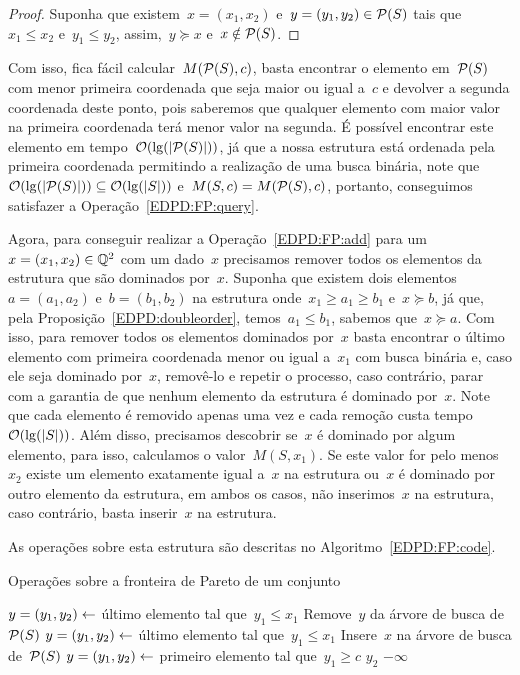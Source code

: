 \begin{proof}
Suponha que existem~$x = (x_1,x_2)$ e~$y = (y_1,y_2) \in \mathcal{P}(S)$ tais que~$x_1 \leq x_2$ e~$y_1 \leq y_2$, assim,~$y \succeq x$ e~$x \notin \mathcal{P}(S)$.
\end{proof}

Com isso, fica fácil calcular~$M(\mathcal{P}(S),c)$, basta encontrar o elemento em~$\mathcal{P}(S)$ com menor primeira coordenada que seja maior ou igual a~$c$ e devolver a segunda coordenada deste ponto, pois saberemos que qualquer elemento com maior valor na primeira coordenada terá menor valor na segunda. É possível encontrar este elemento em tempo~$\mathcal{O}(\lg(|\mathcal{P}(S)|))$, já que a nossa estrutura está ordenada pela primeira coordenada permitindo a realização de uma busca binária, note que~${\mathcal{O}(\lg(|\mathcal{P}(S)|)) \subseteq \mathcal{O}(\lg(|S|))}$ e~$M(S,c) = M(\mathcal{P}(S),c)$, portanto, conseguimos satisfazer a Operação~\ref{EDPD:FP:query}.


Agora, para conseguir realizar a Operação~\ref{EDPD:FP:add} para um~$x = (x_1,x_2) \in \mathbb{Q}^2$ com um dado~$x$ precisamos remover todos os elementos da estrutura que são dominados por~$x$. Suponha que existem dois elementos~$a = (a_1,a_2)$ e~$b = (b_1,b_2)$ na estrutura onde~$x_1 \geq a_1 \geq b_1$ e~$x \succeq b$, já que, pela Proposição~\ref{EDPD:doubleorder}, temos~$a_1 \leq b_1$, sabemos que~$x \succeq a$. Com isso, para remover todos os elementos dominados por~$x$ basta encontrar o último elemento com primeira coordenada menor ou igual a~$x_1$ com busca binária e, caso ele seja dominado por~$x$, removê-lo e repetir o processo, caso contrário, parar com a garantia de que nenhum elemento da estrutura é dominado por~$x$. Note que cada elemento é removido apenas uma vez e cada remoção custa tempo~$\mathcal{O}(\lg(|S|))$. Além disso, precisamos descobrir se~$x$ é dominado por algum elemento, para isso, calculamos o valor~$M(S,x_1)$. Se este valor for pelo menos~$x_2$ existe um elemento exatamente igual a~$x$ na estrutura ou~$x$ é dominado por outro elemento da estrutura, em ambos os casos, não inserimos~$x$ na estrutura, caso contrário, basta inserir~$x$ na estrutura.

As operações sobre esta estrutura são descritas no Algoritmo~\ref{EDPD:FP:code}.

\begin{algorithm}[h]
\caption{Operações sobre a fronteira de Pareto de um conjunto}
\label{EDPD:FP:code}
\begin{algorithmic}[1]
    \State $y = (y_1,y_2) \leftarrow$ último elemento tal que~$y_1 \leq x_1$
        \State Remove~$y$ da árvore de busca de~$\mathcal{P}(S)$
        \State $y = (y_1,y_2) \leftarrow$ último elemento tal que~$y_1 \leq x_1$
    \EndWhile
        \State Insere~$x$ na árvore de busca de~$\mathcal{P}(S)$
    \EndIf
\EndFunction
{}
    \State $y = (y_1,y_2) \leftarrow$ primeiro elemento tal que~$y_1 \geq c$
        \State \Return $y_2$
    \Else
        \State \Return $-\infty$
    \EndIf
\EndFunction
\end{algorithmic}
\end{algorithm}


